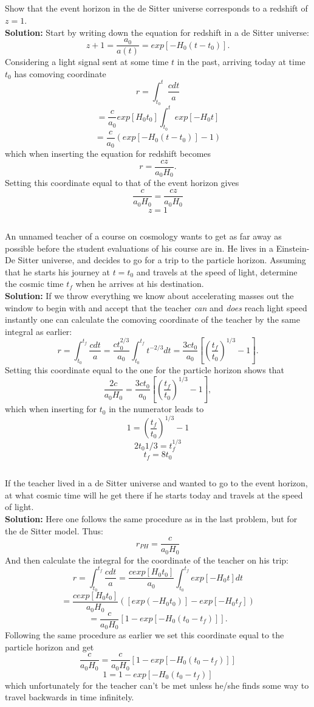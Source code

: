 \documentclass[a4paper,12pt]{article}
\begin{document}
\subsection{}
Show that the event horizon in the de Sitter universe corresponds to a redshift of $z = 1$.\\
\textbf{Solution:}
Start by writing down the equation for redshift in a de Sitter universe:
$$z + 1 = \frac{a_0}{a(t)} = exp[-H_0(t-t_0)].$$
Considering a light signal sent at some time $t$ in the past, arriving today at time $t_0$ has comoving coordinate
$$r = \int_{t_0}^{t}\frac{cdt}{a}$$
$$  = \frac{c}{a_0}exp[H_0t_0]\int_{t_0}^{t}exp[-H_0t]$$
$$  = \frac{c}{a_0}(exp[-H_0(t-t_0)]-1)$$
which when inserting the equation for redshift becomes
$$r = \frac{cz}{a_0H_0}.$$ 
Setting this coordinate equal to that of the event horizon gives
$$ \frac{c}{a_0H_0} = \frac{cz}{a_0H_0}$$
$$ z = 1$$
\subsection{}
An unnamed teacher of a course on cosmology wants to get as far away as possible before the student evaluations of his course are in. He lives in a Einstein-De Sitter universe, and decides to go for a trip to the particle horizon. Assuming that he starts his journey at $t = t_{0}$ and travels at the speed of light, determine the cosmic time $t_f$ when he arrives at his destination.\\
\textbf{Solution:}
If we throw everything we know about accelerating masses out the window to begin with and accept that the teacher \textit{can} and \textit{does} reach light speed instantly one can calculate the comoving coordinate of the teacher by the same integral as earlier:
$$r = \int_{t_0}^{t_f}\frac{cdt}{a}= \frac{ct_0^{2/3}}{a_0}\int_{t_0}^{t_f}t^{-2/3}dt = \frac{3ct_0}{a_0}[(\frac{t_f}{t_0})^{1/3} - 1 ].$$
Setting this coordinate equal to the one for the particle horizon shows that
$$\frac{2c}{a_0H_0} = \frac{3ct_0}{a_0}[(\frac{t_f}{t_0})^{1/3}-1],$$ which when inserting for $t_0$ in the numerator leads to 
$$ 1 = (\frac{t_f}{t_0})^{1/3} -1$$
$$2t_0{1/3} = t_f^{1/3}$$
$$t_f = 8t_0$$

\subsection{}
If the teacher lived in a de Sitter universe and wanted to go to the event horizon, at what cosmic time will he get there if he starts today and travels at the speed of light.\\
\textbf{Solution:}
Here one follows the same procedure as in the last problem, but for the de Sitter model.
Thus:
$$r_{PH} = \frac{c}{a_0H_0}$$
And then calculate the integral for the coordinate of the teacher on his trip:
$$r = \int_{t_0}^{t_f}\frac{cdt}{a}= \frac{cexp[H_0t_0]}{a_0}\int_{t_0}^{t_f}exp[-H_0t]dt$$
$$ = \frac{cexp[H_0t_0]}{a_0H_0}([exp(-H_0t_0)]-exp[-H_0t_f])$$
$$ = \frac{c}{a_0H_0}[1-exp[-H_0(t_0-t_f)]].$$
Following the same procedure as earlier we set this coordinate equal to the particle horizon and get
$$\frac{c}{a_0H_0}  = \frac{c}{a_0H_0}[1-exp[-H_0(t_0-t_f)]]$$
$$ 1 = 1-exp[-H_0(t_0-t_f)]$$ 
which unfortunately for the teacher can't be met unless he/she finds some way to travel backwards in time infinitely.
\end{document}
